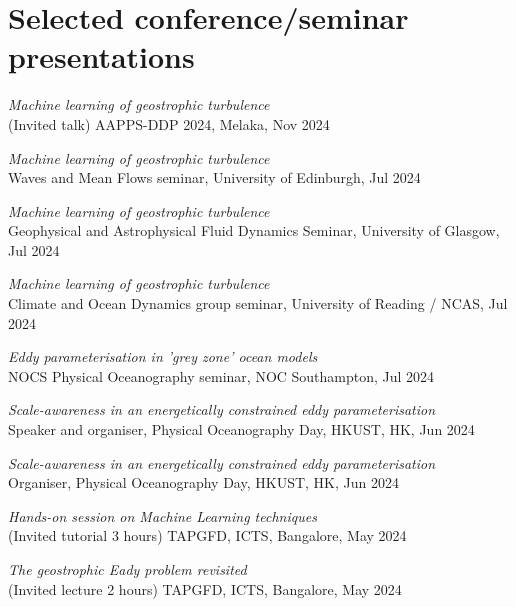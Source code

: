 \documentclass[letterpaper]{article}
\renewenvironment{itemize}{
  \begin{list}{}{
    \setlength{\leftmargin}{1.5em}
  }
}{
  \end{list}
}
\begin{document}
\section*{Selected conference/seminar presentations}
\begin{itemize}

\item[--] \textit{Machine learning of geostrophic turbulence}\\
(Invited talk) AAPPS-DDP 2024, Melaka, Nov 2024

\item[--] \textit{Machine learning of geostrophic turbulence}\\
Waves and Mean Flows seminar, University of Edinburgh, Jul 2024

\item[--] \textit{Machine learning of geostrophic turbulence}\\
Geophysical and Astrophysical Fluid Dynamics Seminar, University of Glasgow, Jul 2024

\item[--] \textit{Machine learning of geostrophic turbulence}\\
Climate and Ocean Dynamics group seminar, University of Reading / NCAS, Jul 2024

\item[--] \textit{Eddy parameterisation in 'grey zone' ocean models}\\
NOCS Physical Oceanography seminar, NOC Southampton, Jul 2024

\item[--] \textit{Scale-awareness in an energetically constrained eddy parameterisation}\\
Speaker and organiser, Physical Oceanography Day, HKUST, HK, Jun 2024

\item[--] \textit{Scale-awareness in an energetically constrained eddy parameterisation}\\
Organiser, Physical Oceanography Day, HKUST, HK, Jun 2024

\item[--] \textit{Hands-on session on Machine Learning techniques}\\
(Invited tutorial 3 hours) TAPGFD, ICTS, Bangalore, May 2024

\item[--] \textit{The geostrophic Eady problem revisited}\\
(Invited lecture 2 hours) TAPGFD, ICTS, Bangalore, May 2024

\end{itemize}
\end{document}
